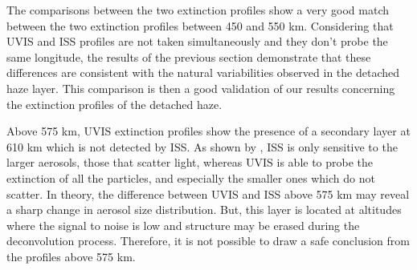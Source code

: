 The comparisons between the two extinction profiles show a very good match between the two extinction profiles
between 450 and 550 km. Considering that UVIS and ISS profiles are not taken simultaneously and
they don't probe the same longitude, the results of the previous section demonstrate that these differences are
consistent with the natural variabilities observed in the detached haze layer.
This comparison is then a good validation of our results concerning the extinction profiles of the detached haze.

Above 575 km, UVIS extinction profiles show the presence of a secondary layer at 610 km which is not detected
by ISS. As shown by \cite{Cours2011}, ISS is only sensitive to the larger aerosols, those that scatter light, whereas
UVIS is able to probe the extinction of all the particles, and especially the smaller ones which do not scatter.
In theory, the difference between UVIS and ISS above 575 km may reveal a sharp change in aerosol size distribution.
But, this layer is located at altitudes where the signal to noise is low and structure may be erased during the
deconvolution process. Therefore, it is not possible to draw a safe conclusion from the profiles above 575 km.
